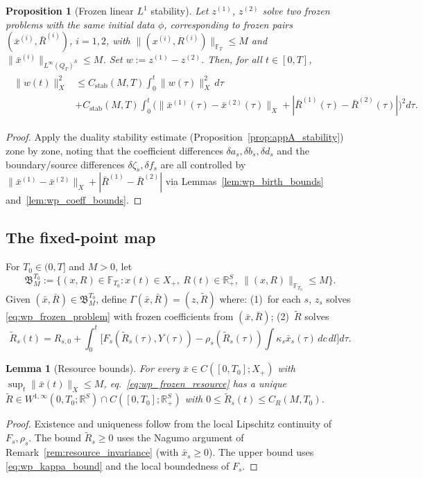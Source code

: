 \documentclass[pdflatex,sn-mathphys-num]{sn-jnl}%
\newtheorem{proposition}[theorem]{Proposition}
\newtheorem{lemma}[theorem]{Lemma}
\begin{document}
\begin{proposition}[Frozen linear \(L^1\) stability]\label{prop:wp_linear_stability}
Let \(z^{(1)}\), \(z^{(2)}\) solve two frozen problems with the same initial data
\(\phi\), corresponding to frozen pairs
\((\bar x^{(i)},\bar R^{(i)})\), \(i=1,2\), with
\(\|(x^{(i)},R^{(i)})\|_{\mathbb F_T}\le M\) and
\(\|\bar x^{(i)}\|_{L^\infty(Q_T)^S}\le M\).
Set \(w:=z^{(1)}-z^{(2)}\). Then, for all \(t\in[0,T]\),
\begin{align}\label{eq:wp_linear_stability}
\begin{aligned}
\|w(t)\|_X^2
&\le
C_{\mathrm{stab}}(M,T)
\int_0^t \|w(\tau)\|_X^2\,d\tau \\[4pt]
&+
C_{\mathrm{stab}}(M,T)
\int_0^t
\Big(\|\bar x^{(1)}(\tau)-\bar x^{(2)}(\tau)\|_X
+|\bar R^{(1)}(\tau)-\bar R^{(2)}(\tau)|\Big)^2d\tau.
\end{aligned}
\end{align}
\end{proposition}
\begin{proof}
Apply the duality stability estimate (Proposition~\ref{prop:appA_stability}) zone by zone,
noting that the coefficient differences \(\delta a_s,\delta b_s,\delta d_s\) and
the boundary/source differences \(\delta\zeta_s,\delta f_s\) are all controlled by
\(\|\bar x^{(1)}-\bar x^{(2)}\|_X+|\bar R^{(1)}-\bar R^{(2)}|\)
via Lemmas~\ref{lem:wp_birth_bounds} and~\ref{lem:wp_coeff_bounds}.
\end{proof}

\subsection{The fixed-point map}
For \(T_0\in(0,T]\) and \(M>0\), let
\[
\mathfrak B_M^{T_0}
:=
\Big\{
(x,R)\in\mathbb F_{T_0}:
x(t)\in X_+,\ R(t)\in\mathbb R_+^S,\
\|(x,R)\|_{\mathbb F_{T_0}}\le M
\Big\}.
\]
Given \((\bar x,\bar R)\in\mathfrak B_M^{T_0}\), define
\(\Gamma(\bar x,\bar R)=(z,\widetilde R)\)
where: (1)~for each \(s\), \(z_s\) solves
\eqref{eq:wp_frozen_problem} with frozen coefficients from \((\bar x,\bar R)\);
(2)~\(\widetilde R\) solves
\begin{equation}\label{eq:wp_frozen_resource}
\widetilde R_s(t)
=R_{s,0}
+\int_0^t
\Big[
F_s(\widetilde R_s(\tau),Y(\tau))
-\rho_s(\widetilde R_s(\tau))
\int\kappa_s\bar x_s(\tau)\,dc\,dl
\Big]d\tau.
\end{equation}

\begin{lemma}[Resource bounds]\label{lem:wp_resource_bounds}
For every \(\bar x\in C([0,T_0];X_+)\) with
\(\sup_t\|\bar x(t)\|_X\le M\),
eq.~\eqref{eq:wp_frozen_resource} has a unique
\(\widetilde R\in W^{1,\infty}(0,T_0;\mathbb R^S)\cap C([0,T_0];\mathbb R_+^S)\)
with \(0\le \widetilde R_s(t)\le C_R(M,T_0)\).
\end{lemma}
\begin{proof}
Existence and uniqueness follow from the local Lipschitz continuity of \(F_s,\rho_s\).
The bound \(\widetilde R_s\ge 0\) uses the Nagumo argument of
Remark~\ref{rem:resource_invariance} (with \(\bar x_s\ge 0\)). The upper bound uses
\eqref{eq:wp_kappa_bound} and the local boundedness of \(F_s\).
\end{proof}
\end{document}
